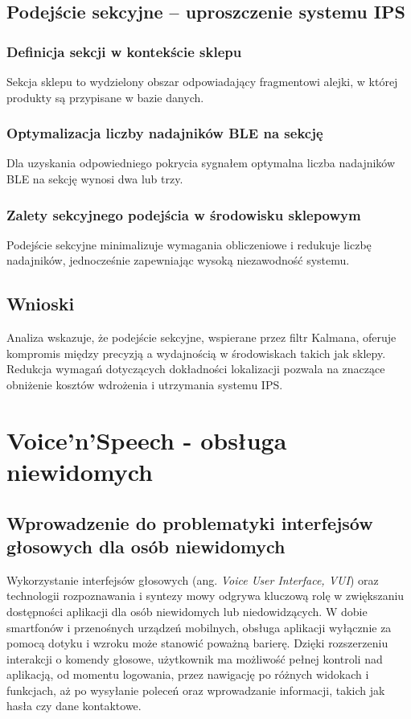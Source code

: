 \subsection{Podejście sekcyjne – uproszczenie systemu IPS}

\subsubsection{Definicja sekcji w kontekście sklepu}
Sekcja sklepu to wydzielony obszar odpowiadający fragmentowi alejki, w której produkty są przypisane w bazie danych.

\subsubsection{Optymalizacja liczby nadajników BLE na sekcję}
Dla uzyskania odpowiedniego pokrycia sygnałem optymalna liczba nadajników BLE na sekcję wynosi dwa lub trzy.

\subsubsection{Zalety sekcyjnego podejścia w środowisku sklepowym}
Podejście sekcyjne minimalizuje wymagania obliczeniowe i redukuje liczbę nadajników, jednocześnie zapewniając wysoką niezawodność systemu.

\subsection{Wnioski}
Analiza wskazuje, że podejście sekcyjne, wspierane przez filtr Kalmana, oferuje kompromis między precyzją a wydajnością w środowiskach takich jak sklepy. Redukcja wymagań dotyczących dokładności lokalizacji pozwala na znaczące obniżenie kosztów wdrożenia i utrzymania systemu IPS.

\section{Voice'n'Speech - obsługa niewidomych}
\subsection{Wprowadzenie do problematyki interfejsów głosowych dla osób niewidomych}

Wykorzystanie interfejsów głosowych (ang. \textit{Voice User Interface, VUI}) oraz technologii rozpoznawania i syntezy mowy odgrywa kluczową rolę w zwiększaniu dostępności aplikacji dla osób niewidomych lub niedowidzących. W dobie smartfonów i przenośnych urządzeń mobilnych, obsługa aplikacji wyłącznie za pomocą dotyku i wzroku może stanowić poważną barierę. Dzięki rozszerzeniu interakcji o komendy głosowe, użytkownik ma możliwość pełnej kontroli nad aplikacją, od momentu logowania, przez nawigację po różnych widokach i funkcjach, aż po wysyłanie poleceń oraz wprowadzanie informacji, takich jak hasła czy dane kontaktowe.

